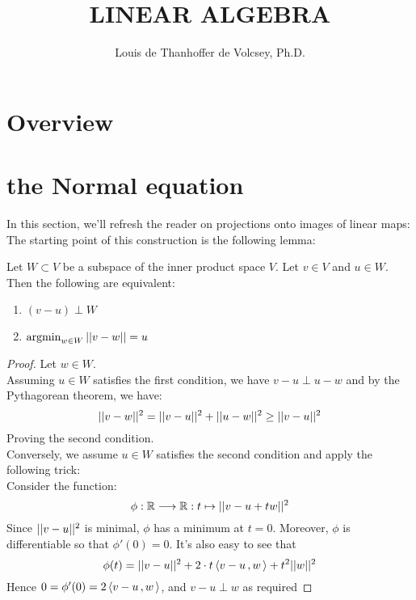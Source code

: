 




\title{LINEAR ALGEBRA}
\date{}
\author{Louis de Thanhoffer de Volcsey, Ph.D.}
\maketitle	

\noindent\hrulefill
\tableofcontents
\noindent\hrulefill

\section{Overview}
\label{section:overview}

\section{the Normal equation}
\label{section:the_normal_equation}

\noindent In this section, we'll refresh the reader on projections onto images of linear maps: The starting point of this construction is the following lemma:
\begin{lemma}\label{lem:mindist-perp}
	Let $W\subset V$ be a subspace of the inner product space $V$. Let $v \in V$ and $u \in W$.\\
	Then the  following are equivalent:
	\begin{enumerate}
		\item $(v-u) \perp W$
		\item $	\operatorname{argmin}_{w \in W}\vert \vert v-w \vert \vert =u$	
	\end{enumerate}
\end{lemma}

\begin{proof}
	Let $w \in W$.\\
	Assuming $u \in W$ satisfies the first condition, we have $v-u \perp u-w$ and by the Pythagorean theorem, we have:
	\[
	\vert \vert v-w \vert \vert^2 = \vert \vert v-u \vert \vert^2+\vert \vert u-w \vert \vert^2 \ge \vert \vert v-u \vert \vert^2
	\]
	Proving the second condition.\\ 
	Conversely, we assume $u\in W$ satisfies the second condition and apply the following trick:\\
	Consider the function:
	\[
	\phi:\mathbb{R}\longrightarrow \mathbb{R}: t \mapsto \vert \vert v-u+tw \vert \vert^2
	\]	
	Since $\vert \vert v-u \vert \vert^2$ is minimal, $\phi$ has a minimum at $t=0$. Moreover, $\phi$ is differentiable so that $\phi'(0)=0$. It's also easy to see that
	\[
	\phi(t) = \vert \vert v-u \vert \vert^2 +2\cdot t \left\langle v-u\,,w\, \right\rangle+t^2\vert \vert w \vert \vert^2
	\]
	Hence $0=\phi'(0) = 2 \left\langle v-u\,,w\, \right\rangle$, and $v-u\perp w$ as required
\end{proof}

